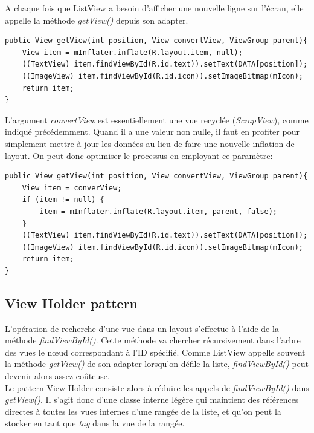 A chaque fois que ListView a besoin d’afficher une nouvelle ligne sur l’écran, elle appelle la méthode \emph{getView()} depuis son adapter.

\begin{adjustbox}{minipage=1.14\textwidth,margin=0pt \smallskipamount,center}
\begin{lstlisting}[style=Java, label=listview1, caption=Version naïve]
public View getView(int position, View convertView, ViewGroup parent){ 
	View item = mInflater.inflate(R.layout.item, null);
	((TextView) item.findViewById(R.id.text)).setText(DATA[position]); 
	((ImageView) item.findViewById(R.id.icon)).setImageBitmap(mIcon);
	return item; 
}
\end{lstlisting}
\end{adjustbox}

\wl L’argument \emph{convertView} est essentiellement une vue recyclée (\emph{ScrapView}), comme indiqué précédemment. Quand il a une valeur non nulle, il faut en profiter pour simplement mettre à jour les données au lieu de faire une nouvelle inflation de layout. On peut donc optimiser le processus en employant ce paramètre:

\begin{adjustbox}{minipage=1.14\textwidth,margin=0pt \smallskipamount,center}
\begin{lstlisting}[style=Java, label=listview2, caption=Version correcte]
public View getView(int position, View convertView, ViewGroup parent){ 
	View item = converView;
	if (item != null) {
		item = mInflater.inflate(R.layout.item, parent, false);
	}
	((TextView) item.findViewById(R.id.text)).setText(DATA[position]); 
	((ImageView) item.findViewById(R.id.icon)).setImageBitmap(mIcon);
	return item; 
}
\end{lstlisting}
\end{adjustbox}

\newpage
\subsection*{View Holder pattern}
L'opération de recherche d'une vue dans un layout s'effectue à l'aide de la méthode \emph{findViewById()}. Cette méthode va chercher récursivement dans l'arbre des vues le nœud correspondant à l'ID spécifié. Comme ListView appelle souvent la méthode \emph{getView()} de son adapter lorsqu'on défile la liste, \emph{findViewById()} peut devenir alors assez coûteuse.\\
Le pattern View Holder consiste alors à réduire les appels de \emph{findViewById()} dans \emph{getView()}. Il s'agit donc d'une classe interne légère qui maintient des références directes à toutes les vues internes d'une rangée de la liste, et qu'on peut la stocker en tant que \emph{tag} dans la vue de la rangée.\\

